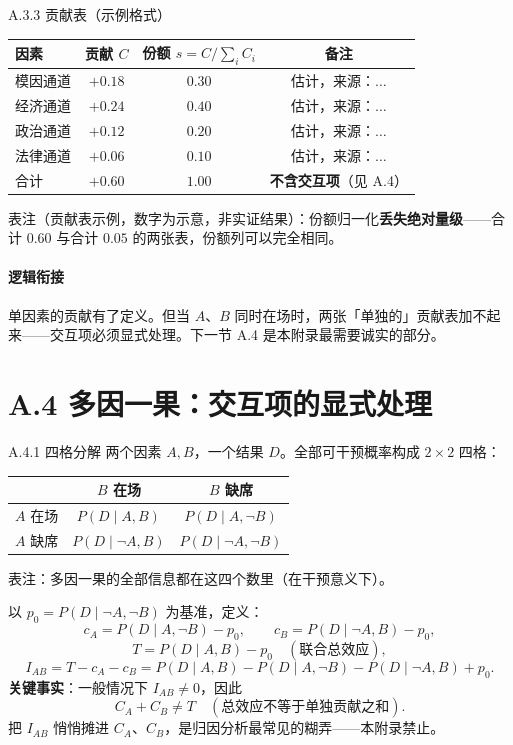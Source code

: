 \documentclass[../../main2.tex]{subfiles}
\begin{document}
	\begin{mathbox}{A.3.3 贡献表（示例格式）}
		\begin{center}
		\begin{tabular}{lccc}
			\toprule
			因素 & 贡献 $C$ & 份额 $s = C / \sum_i C_i$ & 备注 \\
			\midrule
			模因通道 & $+0.18$ & $0.30$ & 估计，来源：$\ldots$ \\
			经济通道 & $+0.24$ & $0.40$ & 估计，来源：$\ldots$ \\
			政治通道 & $+0.12$ & $0.20$ & 估计，来源：$\ldots$ \\
			法律通道 & $+0.06$ & $0.10$ & 估计，来源：$\ldots$ \\
			\midrule
			合计 & $+0.60$ & $1.00$ & \textbf{不含交互项}（见 A.4） \\
			\bottomrule
		\end{tabular}

		{\small 表注（贡献表示例，数字为示意，非实证结果）：份额归一化\textbf{丢失绝对量级}——合计 $0.60$ 与合计 $0.05$ 的两张表，份额列可以完全相同。}
		\end{center}
	\end{mathbox}

	\paragraph*{逻辑衔接}
	单因素的贡献有了定义。但当 $A$、$B$ 同时在场时，两张「单独的」贡献表加不起来——交互项必须显式处理。下一节 A.4 是本附录最需要诚实的部分。

	\section{A.4 多因一果：交互项的显式处理}
	\label{app:interaction}


	\begin{mathbox}{A.4.1 四格分解}
		两个因素 $A, B$，一个结果 $D$。全部可干预概率构成 $2 \times 2$ 四格：
		\begin{center}
		\begin{tabular}{lcc}
			\toprule
			 & $B$ 在场 & $B$ 缺席 \\
			\midrule
			$A$ 在场 & $P(D \mid A, B)$ & $P(D \mid A, \neg B)$ \\
			$A$ 缺席 & $P(D \mid \neg A, B)$ & $P(D \mid \neg A, \neg B)$ \\
			\bottomrule
		\end{tabular}

		{\small 表注：多因一果的全部信息都在这四个数里（在干预意义下）。}
		\end{center}
		以 $p_0 = P(D \mid \neg A, \neg B)$ 为基准，定义：
		\[ c_A = P(D \mid A, \neg B) - p_0, \qquad c_B = P(D \mid \neg A, B) - p_0, \]
		\[ T = P(D \mid A, B) - p_0 \quad (\text{联合总效应}), \]
		\[ I_{AB} = T - c_A - c_B = P(D \mid A, B) - P(D \mid A, \neg B) - P(D \mid \neg A, B) + p_0. \]
		\textbf{关键事实}：一般情况下 $I_{AB} \neq 0$，因此
		\[ C_A + C_B \neq T \quad (\text{总效应不等于单独贡献之和}). \]
		把 $I_{AB}$ 悄悄摊进 $C_A$、$C_B$，是归因分析最常见的糊弄——本附录禁止。
	\end{mathbox}
\end{document}
